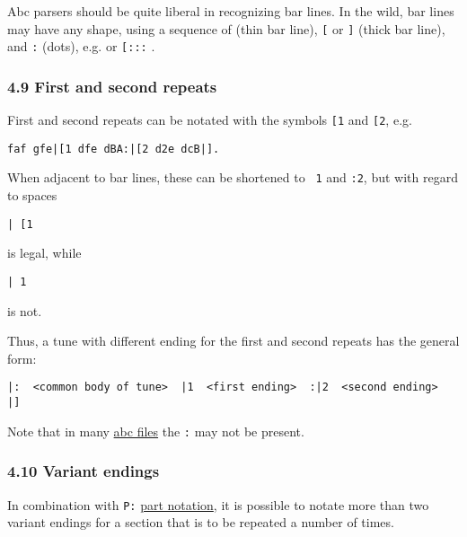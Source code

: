Abc parsers should be quite liberal in recognizing bar lines. In the
wild, bar lines may have any shape, using a sequence of
\texttt{\textbar{}} (thin bar line), \texttt{{[}} or \texttt{{]}} (thick
bar line), and \texttt{:} (dots), e.g. \texttt{\textbar{}{[}\textbar{}}
or \texttt{{[}\textbar{}:::} .

\hypertarget{first_and_second_repeats}{\subsubsection{4.9 First and
second repeats}\label{first_and_second_repeats}}

First and second repeats can be notated with the symbols \texttt{{[}1}
and \texttt{{[}2}, e.g.

\begin{verbatim}
faf gfe|[1 dfe dBA:|[2 d2e dcB|].
\end{verbatim}

When adjacent to bar lines, these can be shortened to
\texttt{\ \textbar{}1} and \texttt{:\textbar{}2}, but with regard to
spaces

\begin{verbatim}
| [1
\end{verbatim}

is legal, while

\begin{verbatim}
| 1
\end{verbatim}

is not.

Thus, a tune with different ending for the first and second repeats has
the general form:

\begin{verbatim}
|:  <common body of tune>  |1  <first ending>  :|2  <second ending>  |]
\end{verbatim}

Note that in many \protect\hyperlink{abc_file_definition}{abc files} the
\texttt{\textbar{}:} may not be present.

\hypertarget{variant_endings}{\subsubsection{4.10 Variant
endings}\label{variant_endings}}

In combination with \texttt{P:} \protect\hyperlink{pparts}{part
notation}, it is possible to notate more than two variant endings for a
section that is to be repeated a number of times.

